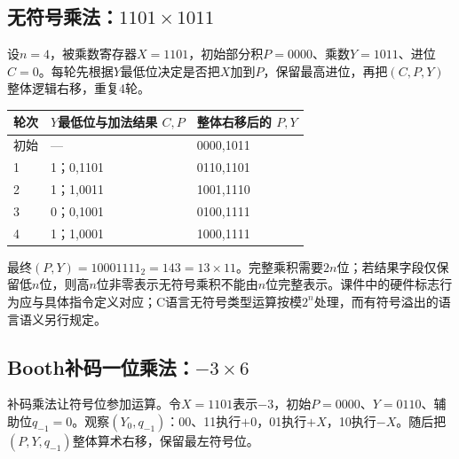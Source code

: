 \subsection{\texorpdfstring{无符号乘法：\(1101\times1011\)}{无符号乘法：1101\textbackslash times1011}}\label{CO02-unsigned-trace}

设\(n=4\)，被乘数寄存器\(X=1101\)，初始部分积\(P=0000\)、乘数\(Y=1011\)、进位\(C=0\)。每轮先根据\(Y\)最低位决定是否把\(X\)加到\(P\)，保留最高进位，再把\((C,P,Y)\)整体逻辑右移，重复4轮。

\par\medskip\noindent\begin{minipage}{\linewidth}\fontsize{9.3}{12}\selectfont\begin{tabularx}{\linewidth}{@{}YYY@{}}
\toprule\noalign{}
轮次 & \(Y\)最低位与加法结果 \(C,P\) & 整体右移后的 \(P,Y\) \\
\midrule\noalign{}


初始 & --- & 0000,1011 \\
1 & 1；0,1101 & 0110,1101 \\
2 & 1；1,0011 & 1001,1110 \\
3 & 0；0,1001 & 0100,1111 \\
4 & 1；1,0001 & 1000,1111 \\
\bottomrule\end{tabularx}
\end{minipage}\par\medskip

最终\((P,Y)=10001111_2=143=13\times11\)。完整乘积需要\(2n\)位；若结果字段仅保留低\(n\)位，则高\(n\)位非零表示无符号乘积不能由\(n\)位完整表示。课件中的硬件标志行为应与具体指令定义对应；C语言无符号类型运算按模\(2^n\)处理，而有符号溢出的语言语义另行规定。

\subsection{\texorpdfstring{Booth补码一位乘法：\(-3\times6\)}{Booth补码一位乘法：-3\textbackslash times6}}\label{CO02-booth-trace}

补码乘法让符号位参加运算。令\(X=1101\)表示\(-3\)，初始\(P=0000\)、\(Y=0110\)、辅助位\(q_{-1}=0\)。观察\((Y_0,q_{-1})\)：00、11执行\(+0\)，01执行\(+X\)，10执行\(-X\)。随后把\((P,Y,q_{-1})\)整体算术右移，保留最左符号位。

